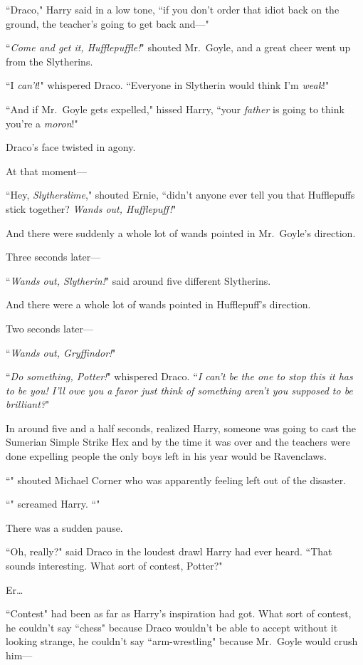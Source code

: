 ``Draco," Harry said in a low tone, ``if you don't order that idiot back on the ground, the teacher's going to get back and—"

``\emph{Come and get it, Hufflepuffle!}" shouted Mr.~Goyle, and a great cheer went up from the Slytherins.

``I \emph{can't}!" whispered Draco. ``Everyone in Slytherin would think I'm \emph{weak}!"

``And if Mr.~Goyle gets expelled," hissed Harry, ``your \emph{father} is going to think you're a \emph{moron}!"

Draco's face twisted in agony.

At that moment—

``Hey, \emph{Slytherslime}," shouted Ernie, ``didn't anyone ever tell you that Hufflepuffs stick together? \emph{Wands out, Hufflepuff!}"

And there were suddenly a whole lot of wands pointed in Mr.~Goyle's direction.

Three seconds later—

``\emph{Wands out, Slytherin!}" said around five different Slytherins.

And there were a whole lot of wands pointed in Hufflepuff's direction.

Two seconds later—

``\emph{Wands out, Gryffindor!}"

``\emph{Do something, Potter!}" whispered Draco. ``\emph{I can't be the one to stop this it has to be you! I'll owe you a favor just think of something aren't you supposed to be brilliant?}"

In around five and a half seconds, realized Harry, someone was going to cast the Sumerian Simple Strike Hex and by the time it was over and the teachers were done expelling people the only boys left in his year would be Ravenclaws.

``" shouted Michael Corner who was apparently feeling left out of the disaster.

``" screamed Harry. ``"

There was a sudden pause.

``Oh, really?" said Draco in the loudest drawl Harry had ever heard. ``That sounds interesting. What sort of contest, Potter?"

Er{\ldots}

``Contest" had been as far as Harry's inspiration had got. What sort of contest, he couldn't say ``chess" because Draco wouldn't be able to accept without it looking strange, he couldn't say ``arm-wrestling" because Mr.~Goyle would crush him—

